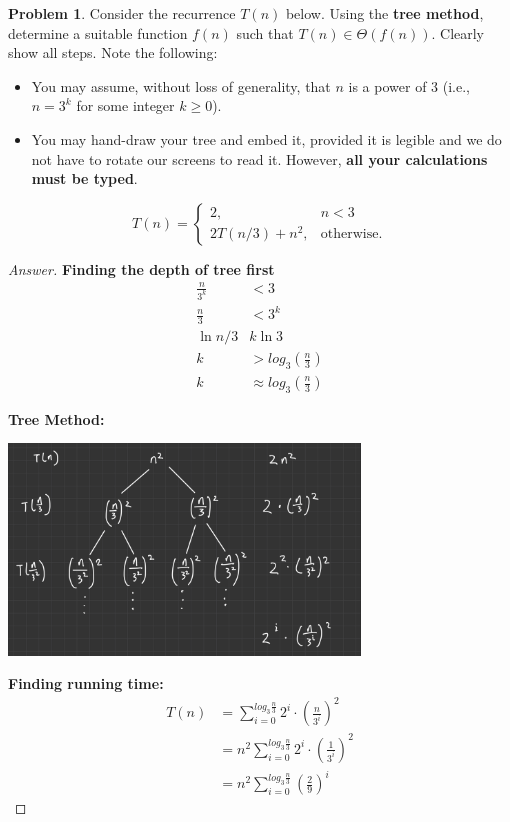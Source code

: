 \documentclass[11pt]{article}
\theoremstyle{definition}
\theoremstyle{definition}
\newtheorem{required}{Problem}
\theoremstyle{definition}
\begin{document}
\begin{required}
Consider the recurrence $T(n)$ below. Using the {\bf tree method}, determine a suitable function $f(n)$ such that $T(n) \in \Theta(f(n))$. Clearly show all steps. Note the following:
\begin{itemize}
\item You may assume, without loss of generality, that $n$ is a power of $3$ (i.e., $n = 3^{k}$ for some integer $k \geq 0$).
\item You may hand-draw your tree and embed it, provided it is legible and we do not have to rotate our screens to read it. However, \textbf{all your calculations must be typed}.
\end{itemize}

\[
T(n) = \begin{cases} 2, &  n < 3 \\ 
2T(n/3) + n^{2}, &  \text{otherwise.} \end{cases}
\]

\end{required}

\begin{proof}[Answer]
\textbf{Finding the depth of tree first}
\begin{align*}
\frac{n}{3^k} &< 3\\
\frac{n}{3} &< 3^k\\
\ln{n/3} &k\ln{3}\\
k &> log_3(\frac{n}{3})\\
k &\approx log_3(\frac{n}{3})
\end{align*}

\textbf{Tree Method:}
\begin{center}
\includegraphics[width=0.7\textwidth]{HW5P3.PNG}
\end{center}

\textbf{Finding running time:\\}
\begin{align*}
T(n) &= \sum _{i=0}^{log_3\frac{n}{3}}2^i\cdot \left(\frac{n}{3^i}\right)^2\\
&= n^2\sum _{i=0}^{log_3\frac{n}{3}}2^i\cdot \left(\frac{1}{3^i}\right)^2\\
&= n^2\sum _{i=0}^{log_3\frac{n}{3}}\left(\frac{2}{9}\right)^i
\end{align*}
\end{proof}
\end{document}
